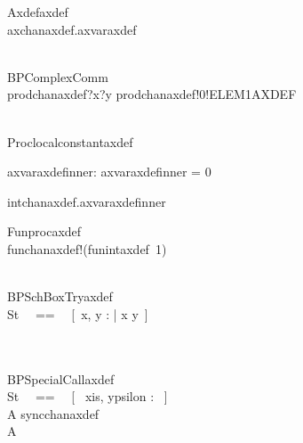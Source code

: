\begin{circus}
 \circprocess Axdefaxdef \circdef \circbegin \\
    \circspot axchanaxdef.axvaraxdef \then \Skip \\
 \circend \\
\end{circus}

\begin{circus}
 \circprocess BPComplexComm \circdef \circbegin \\
    \circspot prodchanaxdef?x?y \then prodchanaxdef!0!ELEM1AXDEF \then \Skip \\
 \circend \\
\end{circus}

\begin{circus}
\circprocess Proclocalconstantaxdef \circdef \circbegin \\
\end{circus}
 \begin{axdef}
  axvaraxdefinner: \nat
\where
  axvaraxdefinner = 0
\end{axdef}
\begin{circusaction}
\circspot intchanaxdef.axvaraxdefinner \then \Skip \\
\end{circusaction}
\begin{circus}
 \circend
\end{circus}

\begin{circus}
 \circprocess Funprocaxdef \circdef \circbegin \\
    \circspot funchanaxdef!(funintaxdef~1) \then \Skip \\
 \circend \\
\end{circus}

\begin{circus}
 \circprocess BPSchBoxTryaxdef \circdef \circbegin \\
    \circstate St ~~==~~ [~x, y : \nat | x \neq y~] \\
    \circspot \Skip \\
 \circend \\
\end{circus}

\begin{circus}
\circprocess BPSpecialCallaxdef \circdef \circbegin \\
    \circstate St ~~==~~ [~ xis, ypsilon : \nat ~] \\
    A \circdef syncchanaxdef \then \Skip \\
    \circspot A \\
 \circend \\
\end{circus}

